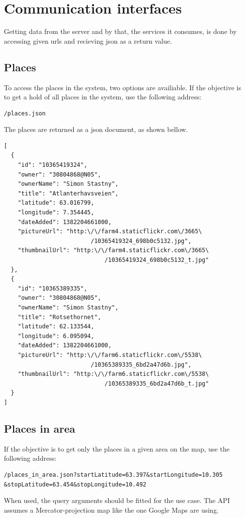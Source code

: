 \documentclass[11pt]{book}
\begin{document}
\section{Communication interfaces}
Getting data from the server and by that, the services it consumes, is done by accessing given \glspl{url} and recieving \gls{json} as a return value.

\subsection{Places}
To access the places in the system, two options are availiable.
If the objective is to get a hold of all places in the system, use the following address:
\begin{lstlisting}[frame=single]
/places.json
\end{lstlisting}

The places are returned as a \gls{json} document, as shown bellow.

\begin{lstlisting}[frame=single]
[
  {
    "id": "10365419324",
    "owner": "30804868@N05",
    "ownerName": "Simon Stastny",
    "title": "Atlanterhavsveien",
    "latitude": 63.016799,
    "longitude": 7.354445,
    "dateAdded": 1382204661000,
    "pictureUrl": "http:\/\/farm4.staticflickr.com\/3665\
                         /10365419324_698b0c5132.jpg",
    "thumbnailUrl": "http:\/\/farm4.staticflickr.com\/3665\
                             /10365419324_698b0c5132_t.jpg"
  },
  {
    "id": "10365389335",
    "owner": "30804868@N05",
    "ownerName": "Simon Stastny",
    "title": "Rotsethornet",
    "latitude": 62.133544,
    "longitude": 6.095094,
    "dateAdded": 1382204661000,
    "pictureUrl": "http:\/\/farm6.staticflickr.com\/5538\
                         /10365389335_6bd2a47d6b.jpg",
    "thumbnailUrl": "http:\/\/farm6.staticflickr.com\/5538\
                             /10365389335_6bd2a47d6b_t.jpg"
  }
]
\end{lstlisting}

\subsection{Places in area}
If the objective is to get only the places in a given area on the map, use the following address: 
\begin{lstlisting}[frame=single]
/places_in_area.json?startLatitude=63.397&startLongitude=10.305
&stopLatitude=63.454&stopLongitude=10.492
\end{lstlisting}
When used, the query arguments should be fitted for the use case. The API assumes a Mercator-projection map like the one Google Maps are using.
\end{document}
